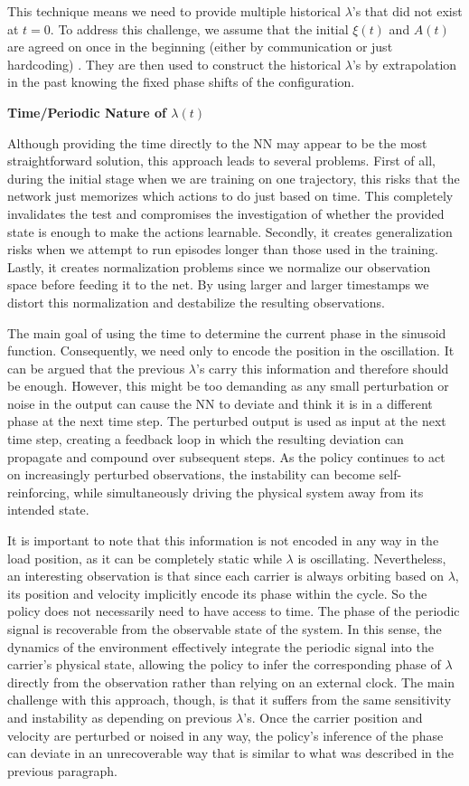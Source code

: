 This technique means we need to provide multiple historical $\lambda$'s
that did not exist at $t=0$. To address this challenge, we assume that
the initial $\xi(t)$ and $A(t)$ are agreed on once in the beginning
(either by communication or just hardcoding) . They are then used to
construct the historical $\lambda$'s by extrapolation in the past
knowing the fixed phase shifts of the configuration.

\noindent\textbf{Time/Periodic Nature of $\lambda(t)$}

Although providing the time directly to the NN may appear to be the most
straightforward solution, this approach leads to several problems.
First of all, during the initial stage when we are training on one
trajectory, this risks that the network just memorizes which actions to
do just based on time. This completely invalidates the test and
compromises the investigation of whether the provided state is enough
to make the actions learnable. Secondly, it creates generalization risks
when we attempt to run episodes longer than those used in the training.
Lastly, it creates normalization problems since we normalize our
observation space before feeding it to the net. By using larger and
larger timestamps we distort this normalization and destabilize the
resulting observations.

The main goal of using the time to determine the current phase in the
sinusoid function. Consequently, we need only to encode the position in
the oscillation. It can be argued that the previous $\lambda$'s carry
this information and therefore should be enough. However, this might be
too demanding as any small perturbation or noise in the output can cause
the NN to deviate and think it is in a different phase at the next time
step. The perturbed output is used as input at the next time step,
creating a feedback loop in which the resulting deviation can propagate
and compound over subsequent steps. As the policy continues to act on
increasingly perturbed observations, the instability can become
self-reinforcing, while simultaneously driving the physical system away
from its intended state.

It is important to note that this information is not encoded in any way
in the load position, as it can be completely static while $\lambda$ is
oscillating. Nevertheless, an interesting observation is that since each
carrier is always orbiting based on $\lambda$, its position and velocity
implicitly encode its phase within the cycle. So the policy does not
necessarily need to have access to time. The phase of the periodic
signal is recoverable from the observable state of the system. In this
sense, the dynamics of the environment effectively integrate the
periodic signal into the carrier's physical state, allowing the policy
to infer the corresponding phase of $\lambda$ directly from the
observation rather than relying on an external clock. The main challenge
with this approach, though, is that it suffers from the same
sensitivity and instability as depending on previous $\lambda$'s. Once the 
carrier
position and velocity are perturbed or noised in any way, the policy’s
inference of the phase can deviate in an unrecoverable way that is
similar to what was described in the previous paragraph.

